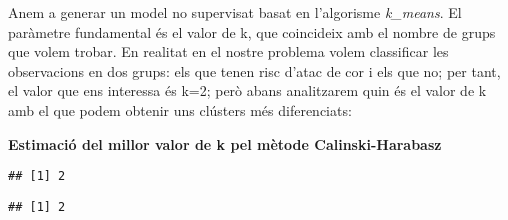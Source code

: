 \documentclass[
]{article}
\newenvironment{Shaded}{\begin{snugshade}}{\end{snugshade}}
\newcommand{\AttributeTok}[1]{\textcolor[rgb]{0.80,0.80,0.80}{#1}}
\newcommand{\DecValTok}[1]{\textcolor[rgb]{0.86,0.86,0.80}{#1}}
\newcommand{\FunctionTok}[1]{\textcolor[rgb]{0.94,0.94,0.56}{#1}}
\newcommand{\NormalTok}[1]{\textcolor[rgb]{0.80,0.80,0.80}{#1}}
\newcommand{\OtherTok}[1]{\textcolor[rgb]{0.94,0.94,0.56}{#1}}
\newcommand{\SpecialCharTok}[1]{\textcolor[rgb]{0.86,0.64,0.64}{#1}}
\newcommand{\StringTok}[1]{\textcolor[rgb]{0.80,0.58,0.58}{#1}}
\begin{document}
Anem a generar un model no supervisat basat en l'algorisme
\emph{k\_means}. El paràmetre fundamental és el valor de k, que
coincideix amb el nombre de grups que volem trobar. En realitat en el
nostre problema volem classificar les observacions en dos grups: els que
tenen risc d'atac de cor i els que no; per tant, el valor que ens
interessa és k=2; però abans analitzarem quin és el valor de k amb el
que podem obtenir uns clústers més diferenciats:

\textbf{Estimació del millor valor de k pel mètode Calinski-Harabasz}

\begin{Shaded}
\end{Shaded}

\begin{verbatim}
## [1] 2
\end{verbatim}

\begin{Shaded}
\end{Shaded}

\begin{verbatim}
## [1] 2
\end{verbatim}

\begin{Shaded}
\end{Shaded}
\end{document}
